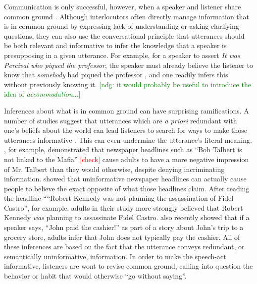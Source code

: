 \documentclass[10pt,letterpaper]{article}
\newcommand{\red}[1]{\textcolor{Red}{#1}}
\newcommand{\ndg}[1]{\textcolor{Green}{[ndg: #1]}}
\begin{document}
Communication is only successful, however, when a speaker and listener share common ground \cite{Clark1996}.
Although interlocutors often directly manage information that is in common ground by  expressing lack of understanding or asking clarifying questions, they can also use the conversational principle that utterances should be both relevant and informative \cite{Grice1975} to infer the knowledge that a speaker is presupposing in a given utterance.
For example, for a speaker to assert \emph{It was Percival who piqued the professor}, the speaker must already believe the listener to know that \emph{somebody} had piqued the professor \cite{Clark1977}, and one readily infers this without previously knowing it. 
\ndg{it would probably be useful to introduce the idea of \emph{accommodation}...}

Inferences about what is in common ground can have surprising ramifications.
A number of studies suggest that utterances which are \emph{a priori} redundant with one's beliefs about the world can lead listeners to search for ways to make those utterances informative \cite{Yandell1979, Wegner1981, Gruenfeld1992, Kravtchenko2015, Degen2015}.  
This can even undermine the utterance's literal meaning.  
, for example, demonstrated that newspaper headlines such as ``Bob Talbert is not linked to the Mafia'' \red{[check]} cause adults to have a more negative impression of Mr. Talbert than they would otherwise, despite denying incriminating information.  
 showed that uninformative newspaper headlines can actually cause people to believe the exact opposite of what those headlines claim.  
After reading the headline ``“Robert Kennedy was not planning the assassination of Fidel Castro'', for example, adults in their study more strongly believed that Robert Kennedy \emph{was} planning to assassinate Fidel Castro.
 also recently showed that if a speaker says, ``John paid the cashier!'' as part of a story about John's trip to a grocery store, adults infer that John does not typically pay the cashier.  
All of these inferences are based on the fact that the utterance conveys redundant, or semantically uninformative, information.
In order to make the speech-act informative, listeners are wont to revise common ground, calling into question the behavior or habit that would otherwise ``go without saying''.


\end{document}

